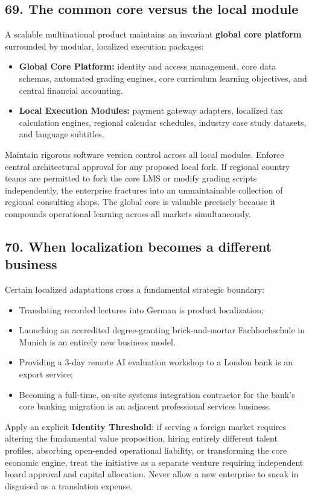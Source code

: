 \subsection{69. The common core versus the local module}

A scalable multinational product maintains an invariant \textbf{global core platform} surrounded by modular, localized execution packages:
\begin{itemize}
    \item \textbf{Global Core Platform:} identity and access management, core data schemas, automated grading engines, core curriculum learning objectives, and central financial accounting.
    \item \textbf{Local Execution Modules:} payment gateway adapters, localized tax calculation engines, regional calendar schedules, industry case study datasets, and language subtitles.
\end{itemize}

Maintain rigorous software version control across all local modules. Enforce central architectural approval for any proposed local fork. If regional country teams are permitted to fork the core LMS or modify grading scripts independently, the enterprise fractures into an unmaintainable collection of regional consulting shops. The global core is valuable precisely because it compounds operational learning across all markets simultaneously.

\subsection{70. When localization becomes a different business}

Certain localized adaptations cross a fundamental strategic boundary:
\begin{itemize}
    \item Translating recorded lectures into German is product localization;
    \item Launching an accredited degree-granting brick-and-mortar Fachhochschule in Munich is an entirely new business model.
    \item Providing a 3-day remote AI evaluation workshop to a London bank is an export service;
    \item Becoming a full-time, on-site systems integration contractor for the bank's core banking migration is an adjacent professional services business.
\end{itemize}

Apply an explicit \textbf{Identity Threshold}: if serving a foreign market requires altering the fundamental value proposition, hiring entirely different talent profiles, absorbing open-ended operational liability, or transforming the core economic engine, treat the initiative as a separate venture requiring independent board approval and capital allocation. Never allow a new enterprise to sneak in disguised as a translation expense.
